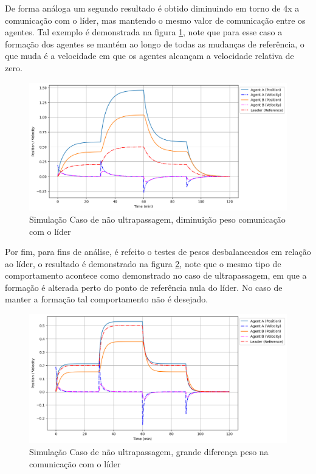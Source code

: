 De forma análoga um segundo resultado é obtido diminuindo em torno de 4x a comunicação com o líder, mas mantendo o mesmo valor de comunicação entre os agentes. Tal exemplo é demonstrada na figura \ref{fig:case5}, note que para esse caso a formação dos agentes se mantém ao longo de todas as mudanças de referência, o que muda é a velocidade em que os agentes alcançam a velocidade relativa de zero.

\begin{figure}[ht]
    \centering
    \caption{Simulação Caso de não ultrapassagem, diminuição peso comunicação com o líder}
    \label{fig:case5}
    \includegraphics[width=1\linewidth]{figures/Simulation/Cooperativo/case5_fg2.png}
\end{figure}

Por fim, para fins de análise, é refeito o testes de pesos desbalanceados em relação ao líder, o resultado é demonstrado na figura \ref{fig:case6}, note que o mesmo tipo de comportamento acontece como demonstrado no caso de ultrapassagem, em que a formação é alterada perto do ponto de referência nula do líder. No caso de manter a formação tal comportamento não é desejado.
\begin{figure}[ht]
    \centering
    \caption{Simulação Caso de não ultrapassagem, grande diferença peso na comunicação com o líder}
    \label{fig:case6}
    \includegraphics[width=1\linewidth]{figures/Simulation/Cooperativo/case6_fg2.png}
\end{figure}
